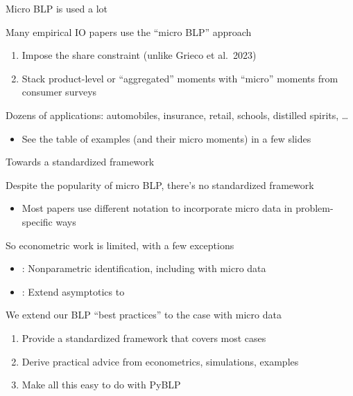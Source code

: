 \documentclass[aspectratio=169,10pt]{beamer}
\begin{document}
\begin{frame}{Micro BLP is used a lot}
    \begin{wideitemize}
        \item Many empirical IO papers use the ``micro BLP'' approach \nocite{berry2004differentiated}
        \begin{enumerate}
            \item Impose the \cite{berry1995automobile} share constraint (unlike {\color{lightgray}Grieco et al.\ 2023}) \nocite{grieco2023conformant}
            \item Stack product-level or ``\alert{aggregated}'' moments with ``\alert{micro}'' moments from consumer surveys
        \end{enumerate}
        \item Dozens of applications: automobiles, insurance, retail, schools, distilled spirits, \ldots
        \begin{itemize}
            \item See the table of examples (and their micro moments) in a few slides
        \end{itemize}
    \end{wideitemize}
\end{frame}

\begin{frame}{Towards a standardized framework}
    \begin{wideitemize}
        \item Despite the popularity of micro BLP, there's \alert{no standardized framework}
        \begin{itemize}
            \item Most papers use different notation to incorporate micro data in problem-specific ways
        \end{itemize}
                \item So econometric work is limited, with a few exceptions
        \begin{itemize}
            \item \cite{berry2014identification,berry2022nonparametric}: Nonparametric identification, including with micro data
            \item \cite{myojo2012asymptotic}: Extend \cite{berry2004limit} asymptotics to \cite{petrin2002quantifying}
        \end{itemize}
                \item We extend our BLP ``best practices'' \citep{conlon2020best} to the case with micro data
        \begin{enumerate}
            \item Provide a \alert{standardized framework} that covers most cases
            \item Derive \alert{practical advice} from econometrics, simulations, examples
            \item Make all this easy to do with \alert{PyBLP}
        \end{enumerate}
    \end{wideitemize}
\end{frame}
\end{document}
